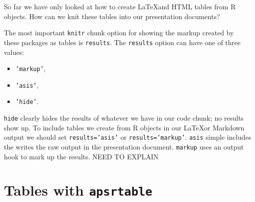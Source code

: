 So far we have only looked at how to create \LaTeX and HTML tables from R objects. How can we knit these tables into our presentation documents?

The most important \texttt{knitr} chunk option for showing the markup created by these packages as tables is \texttt{results}. The \texttt{results} option can have one of three values:

\begin{itemize}
\item
  \texttt{'markup'},
\item
  \texttt{'asis'},
\item
  \texttt{'hide'}.
\end{itemize}

\texttt{hide} clearly hides the results of whatever we have in our code chunk; no results show up. To include tables we create from R objects in our \LaTeX or Markdown output we should set \texttt{results='asis'} or \texttt{results='markup'}. \texttt{asis} simple includes the writes the raw output in the presentation document. \texttt{markup} uses an output hook to mark up the results. NEED TO EXPLAIN 

\section{Tables with \texttt{apsrtable}}



